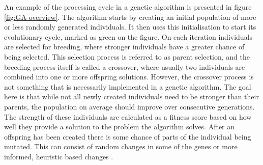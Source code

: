 An example of the processing cycle in a genetic algorithm is presented in figure \ref{fig:GA-overview}. The algorithm starts by creating an initial population of more or less randomly generated individuals. It then uses this initialisation to start its evolutionary cycle, marked as green on the figure. On each iteration individuals are selected for breeding, where stronger individuals have a greater chance of being selected. This selection process is referred to as parent selection, and the breeding process itself is called a crossover, where usually two individuals are combined into one or more offspring solutions. However, the crossover process is not something that is necessarily implemented in a genetic algorithm. The goal here is that while not all newly created individuals need to be stronger than their parents, the population on average should improve over consecutive generations.
The strength of these individuals are calculated as a fitness score based on how well they provide a solution to the problem the algorithm solves. After an offspring has been created there is some chance of parts of the individual being mutated. This can consist of random changes in some of the genes or more informed, heuristic based changes \cite{floreano2008bio}. 

